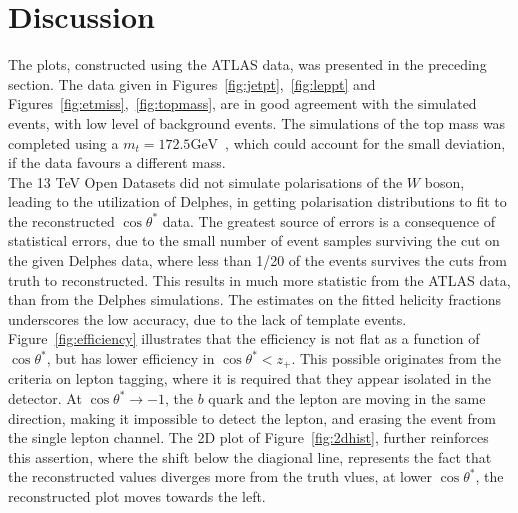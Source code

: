 \documentclass[12pt,a4paper]{article}
\numberwithin{equation}{section}
\begin{document}


\section{Discussion}
The plots, constructed using the ATLAS data, was presented in the preceding
section. The data given in Figures~\ref{fig:jetpt},~\ref{fig:leppt} and
Figures~\ref{fig:etmiss},~\ref{fig:topmass}, are in good agreement with the
simulated events, with low level of background events. The simulations of the
top mass was completed using a $m_t = 172.5 \mathrm{GeV}$~\cite{oreach2020},
which could account for the small deviation, if the data favours a different
mass.\\

The 13 TeV Open Datasets did not simulate polarisations of the $W$ boson,
leading to the utilization of Delphes, in getting polarisation distributions to
fit to the reconstructed $\cos \theta^{*}$ data. The greatest source of errors is a
consequence of statistical errors, due to the small number of event samples
surviving the cut on the given Delphes data, where less than 1/20 of the events
survives the cuts from truth to reconstructed. This results in much more
statistic from the ATLAS data, than from the Delphes simulations. The estimates
on the fitted helicity fractions underscores the low accuracy, due to the lack
of template events.\\

Figure~\ref{fig:efficiency} illustrates that the efficiency is not flat as a
function of $\cos \theta^{*}$, but has lower efficiency in $\cos \theta^{*} < z_+$. This
possible originates from the criteria on lepton tagging, where it is required
that they appear isolated in the detector. At $\cos \theta^{*} \rightarrow -1$, the $b$ quark
and the lepton are moving in the same direction, making it impossible to detect
the lepton, and erasing the event from the single lepton channel. The 2D plot of
Figure~\ref{fig:2dhist}, further reinforces this assertion, where the shift
below the diagional line, represents the fact that the reconstructed values
diverges more from the truth vlues, at lower $\cos \theta^{*}$, the reconstructed
plot moves towards the left.\\
\end{document}
